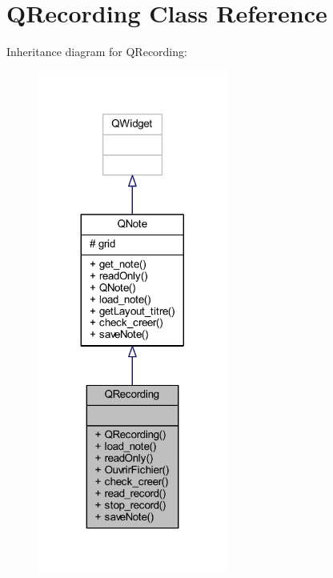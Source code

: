 \hypertarget{class_q_recording}{}\section{Q\+Recording Class Reference}
\label{class_q_recording}


Inheritance diagram for Q\+Recording\+:\nopagebreak
\begin{figure}[H]
\begin{center}
\leavevmode
\includegraphics[width=176pt]{class_q_recording__inherit__graph}
\end{center}
\end{figure}


